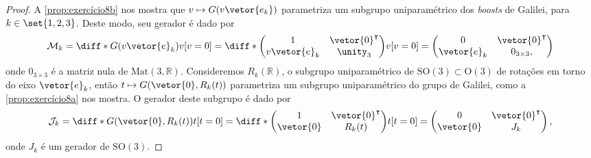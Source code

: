 \begin{proof}
    A \cref{prop:exercício8b} nos mostra que \(v \mapsto G(v\vetor{e_k})\) parametriza um subgrupo uniparamétrico dos \emph{boosts} de Galilei, para \(k \in \set{1,2,3}\). Deste modo, seu gerador é dado por
    \begin{equation*}
        \mathcal{M}_k = \diff*{G(v \vetor{e}_k)}{v}[v=0] = \diff*{\begin{pmatrix}
                1 & \vetor{0}^\intercal\\
                v\vetor{e}_k & \unity_3
        \end{pmatrix}}{v}[v=0] = \begin{pmatrix}
                0 & \vetor{0}^\intercal\\
                \vetor{e}_k & 0_{3\times 3},
        \end{pmatrix}
    \end{equation*}
    onde \(0_{3\times3}\) é a matriz nula de \(\mathrm{Mat}(3,\mathbb{R})\). Consideremos \(R_k(\mathbb{R})\), o subgrupo uniparamétrico de \(\mathrm{SO}(3) \subset \mathrm{O}(3)\) de rotações em torno do eixo \(\vetor{e}_k\), então \(t \mapsto G(\vetor{0}, R_k(t))\) parametriza um subgrupo uniparamétrico do grupo de Galilei, como a \cref{prop:exercício8a} nos mostra. O gerador deste subgrupo é dado por
    \begin{equation*}
        \mathcal{J}_k = \diff*{G(\vetor{0}, R_k(t))}{t}[t=0] = \diff*{\begin{pmatrix}
                1 & \vetor{0}^\intercal\\
                \vetor{0} & R_k(t)
            \end{pmatrix}}{t}[t=0] = \begin{pmatrix}
                0 & \vetor{0}^\intercal\\
                \vetor{0} & J_k
        \end{pmatrix},
    \end{equation*}
    onde \(J_k\) é um gerador de \(\mathrm{SO}(3)\).


\end{proof}
